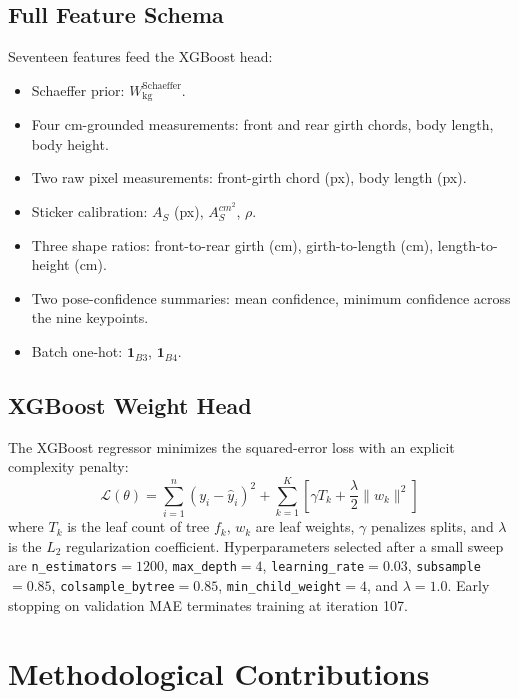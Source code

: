 \documentclass[conference]{IEEEtran}
\begin{document}
\subsection{Full Feature Schema}

Seventeen features feed the XGBoost head:
\begin{itemize}
    \item Schaeffer prior: $W_{\text{kg}}^{\text{Schaeffer}}$.
    \item Four cm-grounded measurements: front and rear girth chords, body length, body height.
    \item Two raw pixel measurements: front-girth chord (px), body length (px).
    \item Sticker calibration: $A_S$ (px), $A_S^{cm^2}$, $\rho$.
    \item Three shape ratios: front-to-rear girth (cm), girth-to-length (cm), length-to-height (cm).
    \item Two pose-confidence summaries: mean confidence, minimum confidence across the nine keypoints.
    \item Batch one-hot: $\mathbf{1}_{B3}$, $\mathbf{1}_{B4}$.
\end{itemize}

\subsection{XGBoost Weight Head}

The XGBoost regressor minimizes the squared-error loss with an explicit complexity penalty:
\begin{equation}
\mathcal{L}(\theta) = \sum_{i=1}^n (y_i - \hat{y}_i)^2 + \sum_{k=1}^K \left[ \gamma T_k + \frac{\lambda}{2} \|w_k\|^2 \right]
\label{eq:xgb_obj}
\end{equation}
where $T_k$ is the leaf count of tree $f_k$, $w_k$ are leaf weights, $\gamma$ penalizes splits, and $\lambda$ is the $L_2$ regularization coefficient. Hyperparameters selected after a small sweep are \texttt{n\_estimators}$=1200$, \texttt{max\_depth}$=4$, \texttt{learning\_rate}$=0.03$, \texttt{subsample}$=0.85$, \texttt{colsample\_bytree}$=0.85$, \texttt{min\_child\_weight}$=4$, and $\lambda = 1.0$. Early stopping on validation MAE terminates training at iteration 107.

\section{Methodological Contributions}
\label{sec:method}
\end{document}
